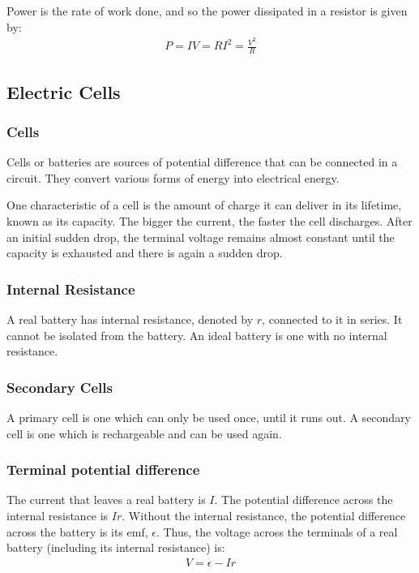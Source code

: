 Power is the rate of work done, and so the power dissipated in a resistor
is given by:
\begin{align*}
    P = IV = RI^2 = \frac{V^2}{R}
\end{align*}

\subsection{Electric Cells}

\subsubsection{Cells}
Cells or batteries are sources of potential difference that can be connected in
a circuit. They convert various forms of energy into electrical energy.

One characteristic of a cell is the amount of charge it can deliver in its
lifetime, known as its capacity. The bigger the current, the faster the cell
discharges. After an initial sudden drop, the terminal voltage remains almost
constant until the capacity is exhausted and there is again a sudden drop.

\subsubsection{Internal Resistance}
A real battery has internal resistance, denoted by $r$, connected to it in
series. It cannot be isolated from the battery. An ideal battery is one with
no internal resistance.

\subsubsection{Secondary Cells}
A primary cell is one which can only be used once, until it runs out. A
secondary cell is one which is rechargeable and can be used again.

\subsubsection{Terminal potential difference}
The current that leaves a real battery is $I$. The potential difference
across the internal resistance is $Ir$. Without the internal resistance, the
potential difference across the battery is its emf, $\epsilon$. Thus, the
voltage across the terminals of a real battery (including its internal
resistance) is:
\begin{align*}
    V = \epsilon - Ir
\end{align*}

